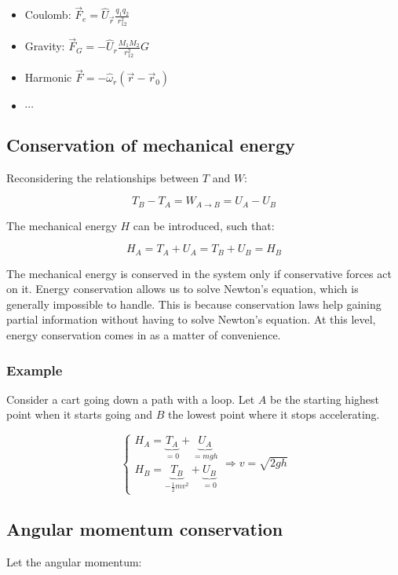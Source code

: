       \begin{multicols}{2}
        \begin{itemize}
          \item Coulomb: $\vec{F}_e = \hat{U}_{\vec{r}}\frac{q_1q_2}{r_{12}^2}$
          \item Gravity: $\vec{F}_G = -\hat{U}_r\frac{M_1M_2}{r_{12}^2}G$
          \item Harmonic $\vec{F} = -\hat{\omega}_r(\vec{r}-\vec{r}_0)$
          \item $\cdots$
        \end{itemize}
      \end{multicols}

  \subsection{Conservation of mechanical energy}
  Reconsidering the relationships between $T$ and $W$:

  $$T_B-T_A = W_{A\rightarrow B} = U_A-U_B$$

  The mechanical energy $H$ can be introduced, such that:

  $$H_A = T_A+U_A = T_B+U_B = H_B$$

  The mechanical energy is conserved in the system only if conservative forces act on it.
  Energy conservation allows us to solve Newton's equation, which is generally impossible to handle.
  This is because conservation laws help gaining partial information without having to solve Newton's equation.
  At this level, energy conservation comes in as a matter of convenience.

    \subsubsection{Example}
    Consider a cart going down a path with a loop.
    Let $A$ be the starting highest point when it starts going and $B$ the lowest point where it stops accelerating.

    $$\begin{cases}H_A = \underbrace{T_A}_{=0}+\underbrace{U_A}_{=mgh}\\
    H_B = \underbrace{T_B}_{-\frac{1}{2}mv^2}+\underbrace{U_B}_{=0}\end{cases}
    \Rightarrow v = \sqrt{2gh}$$

  \subsection{Angular momentum conservation}
  Let the angular momentum:

